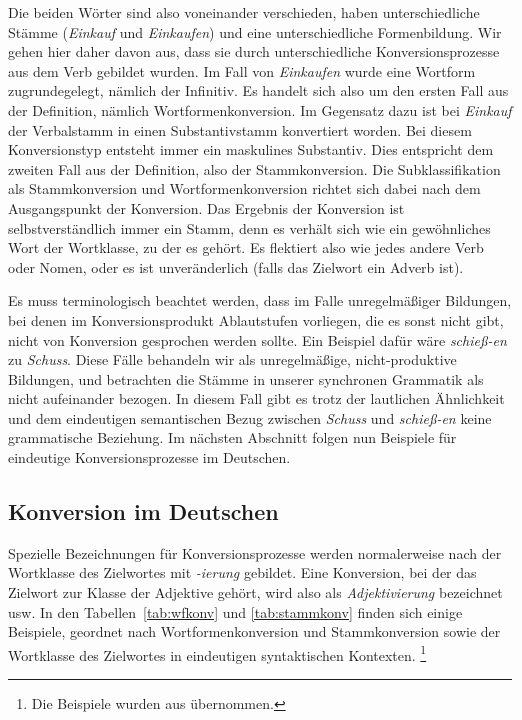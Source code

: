 
Die beiden Wörter sind also voneinander verschieden, haben unterschiedliche Stämme (\textit{Einkauf} und \textit{Einkaufen}) und eine unterschiedliche Formenbildung.
Wir gehen hier daher davon aus, dass sie durch unterschiedliche Konversionsprozesse aus dem Verb gebildet wurden.
Im Fall von \textit{Einkaufen} wurde eine Wortform zugrundegelegt, nämlich der Infinitiv.
Es handelt sich also um den ersten Fall aus der Definition, nämlich Wortformenkonversion.
Im Gegensatz dazu ist bei \textit{Einkauf} der Verbalstamm in einen Substantivstamm konvertiert worden.
Bei diesem Konversionstyp entsteht immer ein maskulines Substantiv.
Dies entspricht dem zweiten Fall aus der Definition, also der Stammkonversion.
Die Subklassifikation als Stammkonversion und Wortformenkonversion richtet sich dabei nach dem Ausgangspunkt der Konversion.
Das Ergebnis der Konversion ist selbstverständlich immer ein Stamm, denn es verhält sich wie ein gewöhnliches Wort der Wortklasse, zu der es gehört.
Es flektiert also wie jedes andere Verb oder Nomen, oder es ist unveränderlich (falls das Zielwort \zB ein Adverb ist).

Es muss terminologisch beachtet werden, dass im Falle unregelmäßiger Bildungen, bei denen \zB im Konversionsprodukt Ablautstufen vorliegen, die es sonst nicht gibt, nicht von Konversion gesprochen werden sollte.
Ein Beispiel dafür wäre \textit{schieß-en} zu \textit{Schuss}.
Diese Fälle behandeln wir als unregelmäßige, nicht-pro\-duk\-ti\-ve Bildungen, und betrachten die Stämme in unserer synchronen Grammatik als nicht aufeinander bezogen.
In diesem Fall gibt es trotz der lautlichen Ähnlichkeit und dem eindeutigen semantischen Bezug zwischen \textit{Schuss} und \textit{schieß-en} keine grammatische Beziehung.
Im nächsten Abschnitt folgen nun Beispiele für eindeutige Konversionsprozesse im Deutschen.

\subsection{Konversion im Deutschen}

\label{sec:konvdeutsch}

Spezielle Bezeichnungen für Konversionsprozesse werden normalerweise nach der Wortklasse des Zielwortes mit \textit{-ierung} gebildet.
Eine Konversion, bei der das Zielwort zur Klasse der Adjektive gehört, wird also als \textit{Adjektivierung} bezeichnet usw.
In den Tabellen~\ref{tab:wfkonv} und \ref{tab:stammkonv} finden sich einige Beispiele, geordnet nach Wortformenkonversion und Stammkonversion sowie der Wortklasse des Zielwortes in eindeutigen syntaktischen Kontexten.%
\footnote{Die Beispiele wurden aus \citealp[280]{Eisenberg1} übernommen.}

